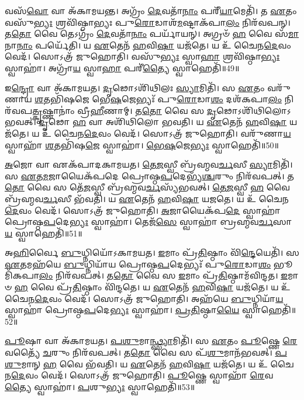 𑌵𑌸᳴\-\ul{𑌵𑍋} 𑌵𑌾 𑌅᳴𑌕𑌾𑌮𑌯𑌨𑍍𑌤।
𑌅𑌗𑍍𑌰𑌂᳴ \ul{𑌦𑍇}\-𑌵𑌤𑌾᳴\-\ul{𑌨𑌾𑌂} 𑌪𑌰𑍀᳴\-\ul{𑌯𑌾}\-𑌮𑍇𑌤𑌿᳴।
𑌤 \ul{𑌏}\-𑌤𑌂 𑌵𑌸𑍁᳴\-\ul{𑌭𑍍𑌯𑌃} 𑌶𑍍𑌰𑌵𑌿᳴𑌷𑍍𑌠𑌾𑌭𑍍𑌯𑌃 𑌪𑍁\-\ul{𑌰𑍋}\-𑌡𑌾𑌶᳴\-\ul{𑌮}\-𑌷𑍍𑌟𑌾\-𑌕᳴𑌪𑌾\-\ul{𑌲𑌂} 𑌨𑌿𑌰᳴𑌵𑌪𑌨𑍍।
𑌤\-\ul{𑌤𑍋} 𑌵𑍈 𑌤𑍇𑌽𑌗𑍍𑌰𑌂᳴ \ul{𑌦𑍇}\-𑌵𑌤𑌾᳴\-\ul{𑌨𑌾𑌂} 𑌪𑌰𑍍𑌯𑌾᳴𑌯𑌨𑍍।
𑌅𑌗𑍍𑌰𑍞᳴ \ul{𑌹} 𑌵𑍈 𑌸᳴\-\ul{𑌮𑌾}\-𑌨𑌾\-\ul{𑌨𑌾𑌂} 𑌪𑌰𑍍𑌯𑍇᳴𑌤𑌿।
𑌯 \ul{𑌏}\-𑌤𑍇𑌨᳴ \ul{𑌹}\-𑌵𑌿\-\ul{𑌷𑌾} 𑌯𑌜᳴𑌤𑍇।
𑌯 𑌉᳴ 𑌚𑍈𑌨\-\ul{𑌦𑍇}\-𑌵𑌂 𑌵𑍇𑌦᳴।
𑌸𑍋𑌽𑌤𑍍𑌰᳴ 𑌜𑍁𑌹𑍋𑌤𑌿।
𑌵𑌸𑍁᳴\-\ul{𑌭𑍍𑌯𑌃} 𑌸𑍍𑌵𑌾\-\ul{𑌹𑌾} 𑌶𑍍𑌰𑌵𑌿᳴𑌷𑍍𑌠𑌾\-\ul{𑌭𑍍𑌯𑌃} 𑌸𑍍𑌵𑌾𑌹𑌾॑।
𑌅𑌗𑍍𑌰𑌾᳴\-\ul{𑌯} 𑌸𑍍𑌵𑌾\-\ul{𑌹𑌾} 𑌪𑌰𑍀॑\-\ul{𑌤𑍍𑌯𑍈} 𑌸𑍍𑌵𑌾𑌹𑍇𑌤𑌿᳴॥49॥

𑌇\-\ul{𑌨𑍍𑌦𑍍𑌰𑍋} 𑌵𑌾 𑌅᳴𑌕𑌾𑌮𑌯𑌤।
\-\ul{𑌦𑍃}\-𑌢𑍋\-𑌽𑌶𑌿᳴𑌥𑌿𑌲𑌃 \ul{𑌸𑍍𑌯𑌾}\-𑌮𑌿𑌤𑌿᳴।
𑌸 \ul{𑌏}\-𑌤𑌂 𑌵𑌰𑍁᳴𑌣𑌾𑌯 \ul{𑌶}\-𑌤𑌭𑌿᳴𑌷𑌜𑍇 𑌭𑍇\-\ul{𑌷}\-𑌜𑍇𑌭𑍍𑌯𑌃᳴ 𑌪𑍁\-\ul{𑌰𑍋}\-𑌡𑌾\-\ul{𑌶𑌂} 𑌦𑌶᳴𑌕𑌪𑌾\-\ul{𑌲𑌂} 𑌨𑌿𑌰᳴𑌵𑌪\-\ul{𑌤𑍍𑌕𑍃}\-𑌷𑍍𑌣𑌾𑌨𑌾𑌂॑ 𑌵𑍍𑌰𑍀\-\ul{𑌹𑍀}\-𑌣𑌾𑌮𑍍।
𑌤\-\ul{𑌤𑍋} 𑌵𑍈 𑌸 \ul{𑌦𑍃}\-𑌢𑍋\-𑌽𑌶𑌿᳴𑌥𑌿𑌲𑍋\-𑌽𑌭𑌵𑌤𑍍।
\-\ul{𑌦𑍃}\-𑌢𑍋 \ul{𑌹} 𑌵𑌾 𑌅𑌶𑌿᳴𑌥𑌿𑌲𑍋 𑌭𑌵𑌤𑌿।
𑌯 \ul{𑌏}\-𑌤𑍇𑌨᳴ \ul{𑌹}\-𑌵𑌿\-\ul{𑌷𑌾} 𑌯𑌜᳴𑌤𑍇।
𑌯 𑌉᳴ 𑌚𑍈𑌨\-\ul{𑌦𑍇}\-𑌵𑌂 𑌵𑍇𑌦᳴।
𑌸𑍋𑌽𑌤𑍍𑌰᳴ 𑌜𑍁𑌹𑍋𑌤𑌿।
𑌵𑌰𑍁᳴𑌣𑌾\-\ul{𑌯} 𑌸𑍍𑌵𑌾𑌹𑌾᳴ \ul{𑌶}\-𑌤𑌭𑌿᳴𑌷\-\ul{𑌜𑍇} 𑌸𑍍𑌵𑌾𑌹𑌾॑।
\-\ul{𑌭𑍇}\-\-\ul{𑌷}\-𑌜𑍇\-\ul{𑌭𑍍𑌯𑌃} 𑌸𑍍𑌵𑌾𑌹𑍇𑌤𑌿᳴॥50॥

\-\ul{𑌅}\-𑌜𑍋 𑌵𑌾 𑌏𑌕᳴𑌪𑌾𑌦𑌕𑌾𑌮𑌯𑌤।
\-\ul{𑌤𑍇}\-\-\ul{𑌜}\-𑌸𑍍𑌵𑍀 𑌬𑍍𑌰᳴𑌹𑍍𑌮𑌵\-\ul{𑌰𑍍𑌚}\-𑌸𑍀 \ul{𑌸𑍍𑌯𑌾}\-𑌮𑌿𑌤𑌿᳴।
𑌸 \ul{𑌏}\-𑌤\-\ul{𑌮}\-𑌜𑌾𑌯𑍈𑌕᳴𑌪𑌦𑍇 𑌪𑍍𑌰𑍋𑌷𑍍𑌠\-\ul{𑌪}\-𑌦𑍇𑌭𑍍𑌯᳴\-\ul{𑌶𑍍𑌚}\-𑌰𑍁𑌂 𑌨𑌿𑌰᳴𑌵𑌪𑌤𑍍।
𑌤\-\ul{𑌤𑍋} 𑌵𑍈 𑌸 𑌤𑍇᳴\-\ul{𑌜}\-𑌸𑍍𑌵𑍀 𑌬𑍍𑌰᳴𑌹𑍍𑌮𑌵\-\ul{𑌰𑍍𑌚}\-𑌸𑍍𑌯᳴𑌭𑌵𑌤𑍍।
\-\ul{𑌤𑍇}\-\-\ul{𑌜}\-𑌸𑍍𑌵𑍀 \ul{𑌹} 𑌵𑍈 𑌬𑍍𑌰᳴𑌹𑍍𑌮𑌵\-\ul{𑌰𑍍𑌚}\-𑌸𑍀 𑌭᳴𑌵𑌤𑌿।
𑌯 \ul{𑌏}\-𑌤𑍇𑌨᳴ \ul{𑌹}\-𑌵𑌿\-\ul{𑌷𑌾} 𑌯𑌜𑌤𑍇।
𑌯 𑌉᳴ 𑌚𑍈𑌨\-\ul{𑌦𑍇}\-𑌵𑌂 𑌵𑍇𑌦᳴।
𑌸𑍋𑌽𑌤𑍍𑌰᳴ 𑌜𑍁𑌹𑍋𑌤𑌿।
\-\ul{𑌅}\-𑌜𑌾𑌯𑍈𑌕᳴𑌪\-\ul{𑌦𑍇} 𑌸𑍍𑌵𑌾𑌹𑌾॑ 𑌪𑍍𑌰𑍋𑌷𑍍𑌠\-\ul{𑌪}\-𑌦𑍇\-\ul{𑌭𑍍𑌯𑌃} 𑌸𑍍𑌵𑌾𑌹𑌾॑।
𑌤𑍇𑌜᳴\-\ul{𑌸𑍇} 𑌸𑍍𑌵𑌾𑌹𑌾॑ 𑌬𑍍𑌰𑌹𑍍𑌮𑌵\-\ul{𑌰𑍍𑌚}\-𑌸𑌾\-\ul{𑌯} 𑌸𑍍𑌵𑌾𑌹𑍇𑌤𑌿᳴॥51॥

𑌅\-\ul{𑌹𑌿}\-𑌰𑍍𑌵𑍈 \ul{𑌬𑍁}\-𑌧𑍍𑌨𑌿𑌯𑍋᳴\-𑌽𑌕𑌾𑌮𑌯𑌤।
\-\ul{𑌇}\-𑌮𑌾𑌂 𑌪𑍍𑌰᳴\-\ul{𑌤𑌿}\-𑌷𑍍𑌠𑌾𑌂 𑌵𑌿᳴\-\ul{𑌨𑍍𑌦𑍇}\-𑌯𑍇𑌤𑌿᳴।
𑌸 \ul{𑌏}\-𑌤𑌮𑌹᳴𑌯𑍇 \ul{𑌬𑍁}\-𑌧𑍍𑌨𑌿𑌯𑌾᳴𑌯 𑌪𑍍𑌰𑍋𑌷𑍍𑌠\-\ul{𑌪}\-𑌦𑍇𑌭𑍍𑌯𑌃᳴ 𑌪𑍁\-\ul{𑌰𑍋}\-𑌡𑌾\-\ul{𑌶𑌂} 𑌭𑍂𑌮𑌿᳴𑌕𑌪𑌾\-\ul{𑌲𑌂} 𑌨𑌿𑌰᳴𑌵𑌪𑌤𑍍।
𑌤\-\ul{𑌤𑍋} 𑌵𑍈 𑌸 \ul{𑌇}\-𑌮𑌾𑌂 𑌪𑍍𑌰᳴\-\ul{𑌤𑌿}\-𑌷𑍍𑌠𑌾𑌮᳴𑌵𑌿𑌨𑍍𑌦𑌤।
\-\ul{𑌇}\-𑌮𑌾𑍞 \ul{𑌹} 𑌵𑍈 𑌪𑍍𑌰᳴\-\ul{𑌤𑌿}\-𑌷𑍍𑌠𑌾𑌂 𑌵𑌿᳴𑌨𑍍𑌦𑌤𑍇।
𑌯 \ul{𑌏}\-𑌤𑍇𑌨᳴ \ul{𑌹}\-𑌵𑌿\-\ul{𑌷𑌾} 𑌯𑌜᳴𑌤𑍇।
𑌯 𑌉᳴ 𑌚𑍈𑌨\-\ul{𑌦𑍇}\-𑌵𑌂 𑌵𑍇𑌦᳴।
𑌸𑍋𑌽𑌤𑍍𑌰᳴ 𑌜𑍁𑌹𑍋𑌤𑌿।
𑌅𑌹᳴𑌯𑍇 \ul{𑌬𑍁}\-𑌧𑍍𑌨𑌿𑌯𑌾᳴\-\ul{𑌯} 𑌸𑍍𑌵𑌾𑌹𑌾॑ 𑌪𑍍𑌰𑍋𑌷𑍍𑌠\-\ul{𑌪}\-𑌦𑍇\-\ul{𑌭𑍍𑌯𑌃} 𑌸𑍍𑌵𑌾𑌹𑌾॑।
\-\ul{𑌪𑍍𑌰}\-\-\ul{𑌤𑌿}\-𑌷𑍍𑌠𑌾\-\ul{𑌯𑍈} 𑌸𑍍𑌵𑌾𑌹𑍇𑌤𑌿᳴॥52॥

\-\ul{𑌪𑍂}\-𑌷𑌾 𑌵𑌾 𑌅᳴𑌕𑌾𑌮𑌯𑌤।
\-\ul{𑌪}\-\-\ul{𑌶𑍁}\-𑌮𑌾\-\ul{𑌨𑍍𑌥𑍍𑌸𑍍𑌯𑌾}\-𑌮𑌿𑌤𑌿᳴।
𑌸 \ul{𑌏}\-𑌤𑌂 \ul{𑌪𑍂}\-𑌷𑍍𑌣𑍇 \ul{𑌰𑍇}\-𑌵𑌤𑍍𑌯𑍈᳴ \ul{𑌚}\-𑌰𑍁𑌂 𑌨𑌿𑌰᳴𑌵𑌪𑌤𑍍।
𑌤\-\ul{𑌤𑍋} 𑌵𑍈 𑌸 𑌪᳴\-\ul{𑌶𑍁}\-𑌮𑌾𑌨᳴𑌭𑌵𑌤𑍍।
\-\ul{𑌪}\-\-\ul{𑌶𑍁}\-𑌮𑌾𑌨𑍍 \ul{𑌹} 𑌵𑍈 𑌭᳴𑌵𑌤𑌿।
𑌯 \ul{𑌏}\-𑌤𑍇𑌨᳴ \ul{𑌹}\-𑌵𑌿\-\ul{𑌷𑌾} 𑌯𑌜᳴𑌤𑍇।
𑌯 𑌉᳴ 𑌚𑍈𑌨\-\ul{𑌦𑍇}\-𑌵𑌂 𑌵𑍇𑌦᳴।
𑌸𑍋𑌽𑌤𑍍𑌰᳴ 𑌜𑍁𑌹𑍋𑌤𑌿।
\-\ul{𑌪𑍂}\-𑌷𑍍𑌣𑍇 𑌸𑍍𑌵𑌾𑌹𑌾᳴ \ul{𑌰𑍇}\-𑌵\-\ul{𑌤𑍍𑌯𑍈} 𑌸𑍍𑌵𑌾𑌹𑌾॑।
\-\ul{𑌪}\-𑌶𑍁\-\ul{𑌭𑍍𑌯𑌃} 𑌸𑍍𑌵𑌾𑌹𑍇𑌤𑌿᳴॥53॥


